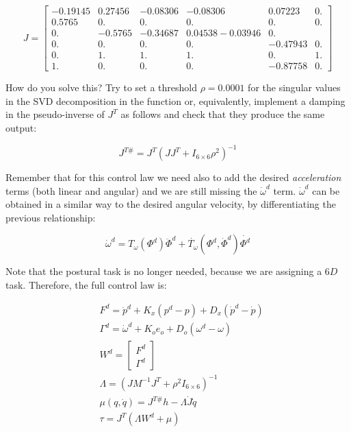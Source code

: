 \documentclass[11pt]{article}
\newcommand{\mat}[1]{\ensuremath{\begin{bmatrix}#1\end{bmatrix}}}	%
\begin{document}
 \begin{equation}
  J = \mat{-0.19145 &0.27456& -0.08306 &-0.08306 & 0.07223 & 0. \\    
  0.5765&   0.    &   0.  &     0.   &    0.  &     0.     \\
  0.    &  -0.5765 & -0.34687&  0.04538 -0.03946  &0.     \\
  0.  &     0.  &     0.    &   0. &     -0.47943 & 0.     \\
  0.  &     1.  &     1.    &   1.  &     0.      & 1.     \\
  1.  &     0.  &     0.    &   0.&      -0.87758 & 0.     }
 \end{equation}

How do you solve this? Try to set a threshold $\rho = 0.0001$ for the singular values in the 
SVD decomposition in the  function or, equivalently, implement  a damping in the pseudo-inverse of $J^T$ as follows and check that they produce the same output: 

\begin{equation}
J^{T\#} = J^T\left(J J^T + I_{6\times 6}\rho^2\right)^{-1}
\end{equation} 

Remember that for this control law we need also to add the desired \textit{acceleration} terms (both linear and angular) and we are still missing the $\dot{\omega}^d$ term. $\dot{\omega}^d$ can be obtained in a similar way to the desired angular velocity, by differentiating the previous relationship:

\begin{equation}
\dot{\omega}^d = T_{\omega}(\Phi^d) \ddot{\Phi}^d +  \dot{T_{\omega}}(\Phi^d,\dot{\Phi}^d ) \dot{\Phi^d}
\end{equation}

Note that the postural task is no longer needed, because we are assigning a $6D$ task. Therefore, the full control law is:
 
\begin{align}
& F^d = \ddot{p}^d + K_x(p^d - p) + D_x(\dot{p}^d -\dot{p})  \\
& \Gamma^d  = \dot{\omega}^d + K_{o} e_o  + D_o(\omega^d - \omega)  \\
& W^d = \mat{F^d \\ \Gamma^d} \\
& \Lambda = (J M^{-1}J^T + \rho^2 I_{6 \times6})^{-1}\\
&\mu(q,\dot{q})  = J^{T\#} h -\Lambda \dot{J} \dot{q} \\
& \tau = J^T\left( \Lambda W^d + \mu \right)
\end{align} 
\end{document}
